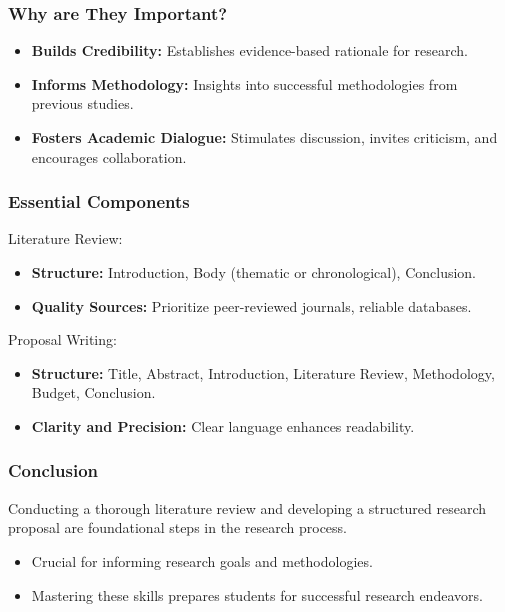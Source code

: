 \documentclass[aspectratio=169]{beamer}
\begin{document}
\begin{frame}[fragile]
    \frametitle{Why are They Important?}
    \begin{itemize}
        \item \textbf{Builds Credibility:} Establishes evidence-based rationale for research.
        \item \textbf{Informs Methodology:} Insights into successful methodologies from previous studies.
        \item \textbf{Fosters Academic Dialogue:} Stimulates discussion, invites criticism, and encourages collaboration.
    \end{itemize}
\end{frame}

\begin{frame}[fragile]
    \frametitle{Essential Components}
    \begin{block}{Literature Review:}
        \begin{itemize}
            \item \textbf{Structure:} Introduction, Body (thematic or chronological), Conclusion.
            \item \textbf{Quality Sources:} Prioritize peer-reviewed journals, reliable databases.
        \end{itemize}
    \end{block}

    \begin{block}{Proposal Writing:}
        \begin{itemize}
            \item \textbf{Structure:} Title, Abstract, Introduction, Literature Review, Methodology, Budget, Conclusion.
            \item \textbf{Clarity and Precision:} Clear language enhances readability.
        \end{itemize}
    \end{block}
\end{frame}

\begin{frame}[fragile]
    \frametitle{Conclusion}
    Conducting a thorough literature review and developing a structured research proposal are foundational steps in the research process. 
    \begin{itemize}
        \item Crucial for informing research goals and methodologies.
        \item Mastering these skills prepares students for successful research endeavors.
    \end{itemize}
\end{frame}
\end{document}
